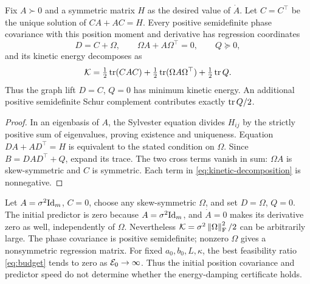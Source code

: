 \begin{proposition}\label{prop:kinetic}
Fix $A\succ0$ and a symmetric matrix $H$ as the desired value of $\dot A$.
Let $C=C^\top$ be the unique solution of $CA+AC=H$.
Every positive semidefinite phase covariance with this position moment and
derivative has regression coordinates
\[
 D=C+\Omega,\qquad \Omega A+A\Omega^\top=0,\qquad Q\succeq0,
\]
and its kinetic energy decomposes as
\begin{equation}\label{eq:kinetic-decomposition}
 \mathcal{K}=\tfrac12\operatorname{tr}(CAC)
    +\tfrac12\operatorname{tr}(\Omega A\Omega^\top)+\tfrac12\operatorname{tr} Q.
\end{equation}
Thus the graph lift $D=C$, $Q=0$ has minimum kinetic energy.
An additional positive semidefinite Schur complement contributes exactly
$\operatorname{tr} Q/2$.
\end{proposition}
\begin{proof}
In an eigenbasis of $A$, the Sylvester equation divides $H_{ij}$ by the
strictly positive sum of eigenvalues, proving existence and uniqueness.
Equation $DA+AD^\top=H$ is equivalent to the stated condition on $\Omega$.
Since $B=DAD^\top+Q$, expand its trace. The two cross terms vanish in sum:
$\Omega A$ is skew-symmetric and $C$ is symmetric. Each term in
\eqref{eq:kinetic-decomposition} is nonnegative.
\end{proof}

\begin{example}
Let $A=\sigma^2\mathrm{Id}_m$, $C=0$, choose any skew-symmetric $\Omega$, and set
$D=\Omega$, $Q=0$. The initial predictor is zero because
$A=\sigma^2\mathrm{Id}_m$, and $\dot A=0$ makes its derivative zero as well,
independently of $\Omega$. Nevertheless
$\mathcal{K}=\sigma^2\left\lVert \Omega \right\rVert_{\mathrm{F}}^2/2$ can be arbitrarily large. The phase
covariance is positive semidefinite; nonzero $\Omega$ gives a nonsymmetric regression matrix.
For fixed $a_0,b_0,L,\kappa$, the best feasibility ratio
\eqref{eq:budget} tends to zero as $\mathcal E_0\to\infty$. Thus the initial
position covariance and predictor speed do not determine whether the
energy-damping certificate holds.
\end{example}

